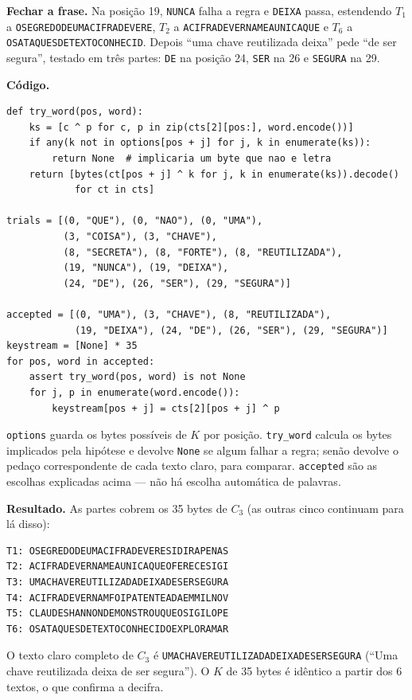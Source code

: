 \documentclass[11pt,a4paper]{article}
\begin{document}
\textbf{Fechar a frase.} Na posição 19, \texttt{NUNCA} falha a regra e
\texttt{DEIXA} passa, estendendo $T_1$ a
\texttt{OSEGREDODEUMACIFRADEVERE}, $T_2$ a
\texttt{ACIFRADEVERNAMEAUNICAQUE} e $T_6$ a
\texttt{OSATAQUESDETEXTOCONHECID}. Depois ``uma chave reutilizada
deixa'' pede ``de ser segura'', testado em três partes: \texttt{DE} na
posição 24, \texttt{SER} na 26 e \texttt{SEGURA} na 29.

\textbf{Código.}

\begin{verbatim}
def try_word(pos, word):
    ks = [c ^ p for c, p in zip(cts[2][pos:], word.encode())]
    if any(k not in options[pos + j] for j, k in enumerate(ks)):
        return None  # implicaria um byte que nao e letra
    return [bytes(ct[pos + j] ^ k for j, k in enumerate(ks)).decode()
            for ct in cts]

trials = [(0, "QUE"), (0, "NAO"), (0, "UMA"),
          (3, "COISA"), (3, "CHAVE"),
          (8, "SECRETA"), (8, "FORTE"), (8, "REUTILIZADA"),
          (19, "NUNCA"), (19, "DEIXA"),
          (24, "DE"), (26, "SER"), (29, "SEGURA")]

accepted = [(0, "UMA"), (3, "CHAVE"), (8, "REUTILIZADA"),
            (19, "DEIXA"), (24, "DE"), (26, "SER"), (29, "SEGURA")]
keystream = [None] * 35
for pos, word in accepted:
    assert try_word(pos, word) is not None
    for j, p in enumerate(word.encode()):
        keystream[pos + j] = cts[2][pos + j] ^ p
\end{verbatim}

\texttt{options} guarda os bytes possíveis de $K$ por posição.
\texttt{try\_word} calcula os bytes implicados pela hipótese e devolve
\texttt{None} se algum falhar a regra; senão devolve o pedaço
correspondente de cada texto claro, para comparar. \texttt{accepted} são
as escolhas explicadas acima --- não há escolha automática de palavras.

\textbf{Resultado.} As partes cobrem os 35 bytes de $C_3$ (as outras
cinco continuam para lá disso):

\begin{verbatim}
T1: OSEGREDODEUMACIFRADEVERESIDIRAPENAS
T2: ACIFRADEVERNAMEAUNICAQUEOFERECESIGI
T3: UMACHAVEREUTILIZADADEIXADESERSEGURA
T4: ACIFRADEVERNAMFOIPATENTEADAEMMILNOV
T5: CLAUDESHANNONDEMONSTROUQUEOSIGILOPE
T6: OSATAQUESDETEXTOCONHECIDOEXPLORAMAR
\end{verbatim}

O texto claro completo de $C_3$ é
\texttt{UMACHAVEREUTILIZADADEIXADESERSEGURA} (``Uma chave reutilizada
deixa de ser segura''). O $K$ de 35 bytes é idêntico a partir dos 6
textos, o que confirma a decifra.
\end{document}
